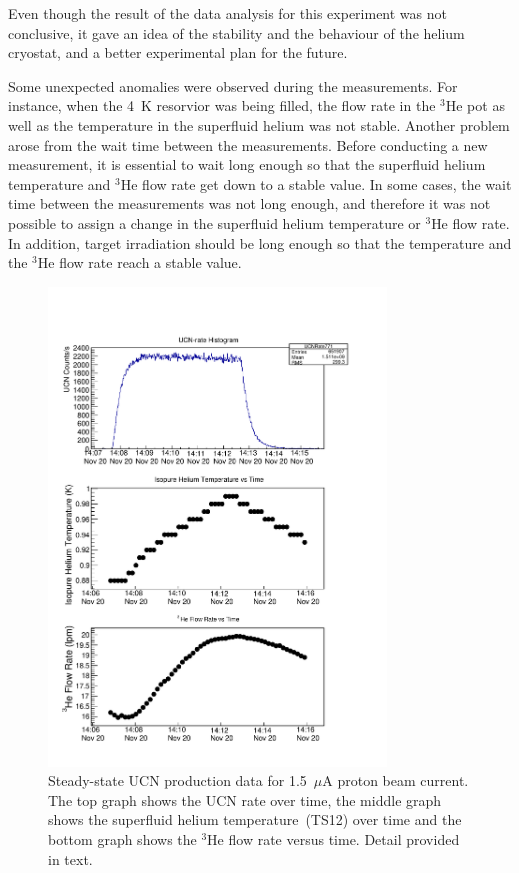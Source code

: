 Even though the result of the data analysis for this experiment was
not conclusive, it gave an idea of the stability and the behaviour of
the helium cryostat, and a better experimental plan for the future.

Some unexpected anomalies were observed during the measurements. For
instance, when the 4~K resorvior was being filled, the flow rate in
the $^3$He pot as well as the temperature in the superfluid helium was
not stable. Another problem arose from the wait time between the
measurements. Before conducting a new measurement, it is essential to
wait long enough so that the superfluid helium temperature and $^3$He
flow rate get down to a stable value. In some cases, the wait time
between the measurements was not long enough, and therefore it was not
possible to assign a change in the superfluid helium temperature or
$^3$He flow rate. In addition, target irradiation should be long
enough so that the temperature and the $^3$He flow rate reach a stable
value.


\begin{figure}[h!]
  \centering \includegraphics[width=0.8\textwidth]{problemrun.pdf}
  \caption[Steady-state UCN production data for 1.5~$\mu$A proton beam
  current]{Steady-state UCN production data for 1.5~$\mu$A proton beam
    current. The top graph shows the UCN rate over time, the middle
    graph shows the superfluid helium temperature~(TS12) over time and
    the bottom graph shows the $^3$He flow rate versus time. Detail
    provided in text.}
\label{fig:problemrun}
\end{figure}

